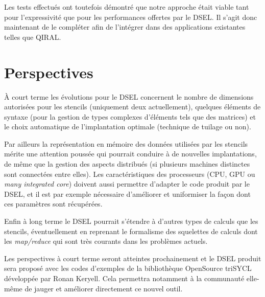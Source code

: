 Les tests effectués ont toutefois démontré que notre approche était viable tant pour l'expressivité que pour les performances offertes par le DSEL. Il s'agit donc maintenant de le compléter afin de l'intégrer dans des applications existantes telles que \textsf{QIRAL}.

\section{Perspectives}

À court terme les évolutions pour le DSEL concernent le nombre de dimensions autorisées pour les stencils (uniquement deux actuellement), quelques éléments de syntaxe (pour la gestion de types complexes d'éléments tels que des matrices) et le choix automatique de l'implantation optimale (technique de tuilage ou non).

Par ailleurs la représentation en mémoire des données utilisées par les stencils mérite une attention poussée qui pourrait conduire à de nouvelles implantations, de même que la gestion des aspects distribués (si plusieurs machines distinctes sont connectées entre elles). Les caractéristiques des  processeurs (CPU, GPU ou \emph{many integrated core}) doivent aussi permettre d'adapter le code produit par le DSEL, et il est par exemple nécessaire d'améliorer et uniformiser la façon dont ces paramètres sont récupérées.

Enfin à long terme le DSEL pourrait s'étendre à d'autres types de calculs que les stencils, éventuellement en reprenant le formalisme des squelettes de calculs dont les \emph{map/reduce} qui sont très courants dans les problèmes actuels.

Les perspectives à court terme seront atteintes prochainement et le DSEL produit sera proposé avec les codes d'exemples de la bibliothèque OpenSource \textsf{triSYCL} développée par Ronan Keryell. Cela permettra notamment à la communauté elle-même de jauger et améliorer directement ce nouvel outil. 

